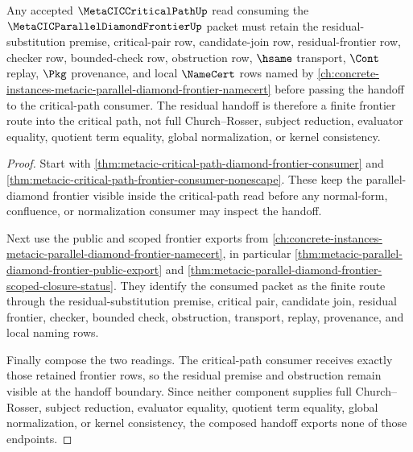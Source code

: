 \begin{theorem}
\label{thm:metacic-critical-path-residual-handoff}
Any accepted $\MetaCICCriticalPathUp$ read consuming the $\MetaCICParallelDiamondFrontierUp$ packet must retain the residual-substitution premise, critical-pair row, candidate-join row, residual-frontier row, checker row, bounded-check row, obstruction row, $\hsame$ transport, $\Cont$ replay, $\Pkg$ provenance, and local $\NameCert$ rows named by \autoref{ch:concrete-instances-metacic-parallel-diamond-frontier-namecert} before passing the handoff to the critical-path consumer. The residual handoff is therefore a finite frontier route into the critical path, not full Church--Rosser, subject reduction, evaluator equality, quotient term equality, global normalization, or kernel consistency.
\end{theorem}
\begin{proof}
Start with \autoref{thm:metacic-critical-path-diamond-frontier-consumer} and \autoref{thm:metacic-critical-path-frontier-consumer-nonescape}. These keep the parallel-diamond frontier visible inside the critical-path read before any normal-form, confluence, or normalization consumer may inspect the handoff.

Next use the public and scoped frontier exports from \autoref{ch:concrete-instances-metacic-parallel-diamond-frontier-namecert}, in particular \autoref{thm:metacic-parallel-diamond-frontier-public-export} and \autoref{thm:metacic-parallel-diamond-frontier-scoped-closure-status}. They identify the consumed packet as the finite route through the residual-substitution premise, critical pair, candidate join, residual frontier, checker, bounded check, obstruction, transport, replay, provenance, and local naming rows.

Finally compose the two readings. The critical-path consumer receives exactly those retained frontier rows, so the residual premise and obstruction remain visible at the handoff boundary. Since neither component supplies full Church--Rosser, subject reduction, evaluator equality, quotient term equality, global normalization, or kernel consistency, the composed handoff exports none of those endpoints.
\end{proof}

